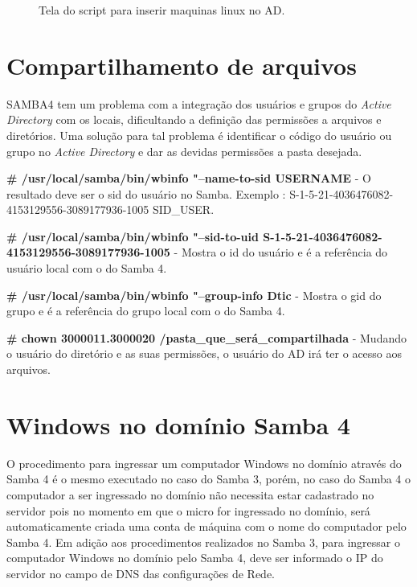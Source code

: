 \begin{figure}[ht]
   	\centering
   	\caption{Tela do script para inserir maquinas linux no AD.}
    \label{smbad}
\end{figure}

\section{Compartilhamento de arquivos}

SAMBA4 tem um problema com a integração dos usuários e grupos do \textit{Active Directory} com os locais, dificultando a definição das permissões a arquivos e diretórios. Uma solução para tal problema é identificar o código do usuário ou grupo no \textit{Active Directory} e dar as devidas permissões a pasta desejada.

\noindent \textbf{\# /usr/local/samba/bin/wbinfo "--name-to-sid USERNAME} - O resultado deve ser o sid do usuário no Samba. Exemplo : S-1-5-21-4036476082-4153129556-3089177936-1005 SID\_USER.

\noindent \textbf{\# /usr/local/samba/bin/wbinfo "--sid-to-uid S-1-5-21-4036476082-4153129556-3089177936-1005} - Mostra o id do usuário e é a referência do usuário local com o do Samba 4.

\noindent \textbf{\# /usr/local/samba/bin/wbinfo "--group-info Dtic} - Mostra o gid do grupo e é a referência do grupo local com o do Samba 4.

\noindent \textbf{\# chown 3000011.3000020 /pasta\_que\_será\_compartilhada} - Mudando o usuário do diretório e as suas permissões, o usuário do AD irá ter o acesso aos arquivos.

\section{Windows no domínio Samba 4}

O procedimento para ingressar um computador Windows no domínio através do Samba 4 é o mesmo executado no caso do Samba 3, porém, no caso do Samba 4 o computador a ser ingressado no domínio não necessita estar cadastrado no servidor pois no momento em que o micro for ingressado no domínio, será automaticamente criada uma conta de máquina com o nome do computador pelo Samba 4.
Em adição aos procedimentos realizados no Samba 3, para ingressar o computador Windows no domínio pelo Samba 4, deve ser informado o IP do servidor no campo de DNS das configurações de Rede.

